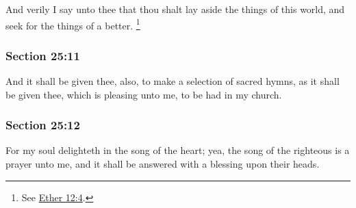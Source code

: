 		And verily I say unto thee that thou shalt lay aside the things of this world, and seek for the things of a better.%
			\footnote{%
				See \hyperref[ETHER-12-4]{Ether 12:4}.
				}


	\subsubsection{Section 25:11} %
		\label{DC25-11}

		And it shall be given thee, also, to make a selection of sacred hymns, as it shall be given thee, which is pleasing unto me, to be had in my church.


	\subsubsection{Section 25:12} %
		\label{DC25-12}

		For my soul delighteth in the song of the heart; yea, the song of the righteous is a prayer unto me, and it shall be answered with a blessing upon their heads.


